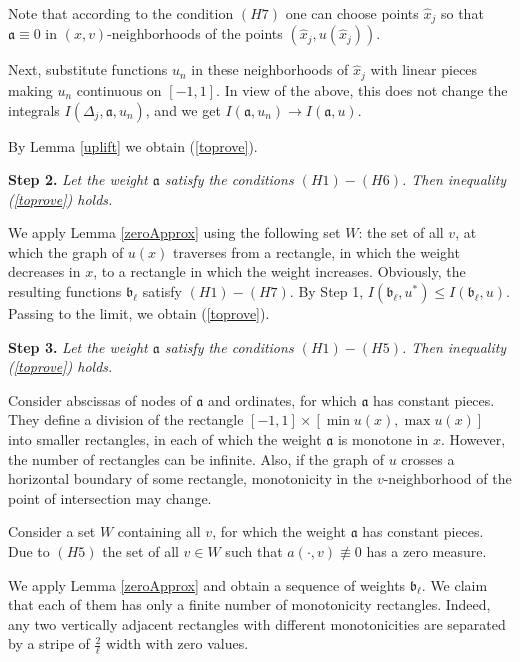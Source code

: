 Note that according to the condition $(H7)$ one can choose points $\hat{x}_j$ so
that $\mathfrak a \equiv 0$ in $(x, v)$-neighborhoods of the points $(\hat{x}_j, u(\hat{x}_j))$.

Next, substitute functions $u_n$ in these neighborhoods of $\hat{x}_j$ with linear pieces
making $u_n$ continuous on $[-1, 1]$.
In view of the above, this does not change the integrals $I(\Delta_j, \mathfrak a, u_n)$,
and we get $I(\mathfrak a, u_n) \to I(\mathfrak a, u)$.

By Lemma \ref{uplift} we obtain (\ref{toprove}).

\bigskip

{\bf Step 2.} {\it Let the weight $\mathfrak a$ satisfy the conditions $(H1)-(H6)$.
Then inequality (\ref{toprove}) holds.}

We apply Lemma \ref{zeroApprox} using the following set $W$:
the set of all $v$, at which the graph of $u(x)$ traverses from a rectangle,
in which the weight decreases in $x$,
to a rectangle in which the weight increases.
Obviously, the resulting functions $\mathfrak b_{\ell}$ satisfy $(H1)-(H7)$.
By Step 1, $I(\mathfrak b_{\ell}, u^*) \le I(\mathfrak b_{\ell}, u)$.
Passing to the limit, we obtain (\ref{toprove}).

\bigskip

{\bf Step 3.} {\it Let the weight $\mathfrak a$ satisfy the conditions $(H1)-(H5)$.
Then inequality (\ref{toprove}) holds.}

Consider abscissas of nodes of $\mathfrak a$
and ordinates, for which $\mathfrak a$ has constant pieces.
They define a division of the rectangle $[-1, 1] \times [\min u(x), \max u(x)]$
into smaller rectangles, in each of which the weight $\mathfrak a$ is monotone in $x$.
However, the number of rectangles can be infinite.
Also, if the graph of $u$ crosses a horizontal boundary of some rectangle,
monotonicity in the $v$-neighborhood of the point of intersection may change.

Consider a set $W$ containing all $v$, for which the weight $\mathfrak a$ has constant pieces.
Due to $(H5)$ the set of all  $v \in W$ such that $a(\cdot, v) \not\equiv 0$ has a zero measure.

We apply Lemma \ref{zeroApprox} and obtain a sequence of weights $\mathfrak b_{\ell}$.
We claim that each of them has only a finite number of monotonicity rectangles.
Indeed, any two vertically adjacent rectangles with different monotonicities
are separated by a stripe of $\frac{2}{\ell}$ width with zero values.

